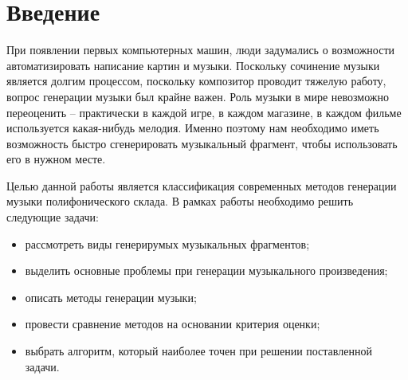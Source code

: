 \chapter*{Введение}

При появлении первых компьютерных машин, люди задумались о возможности автоматизировать написание картин и музыки. Поскольку сочинение музыки является долгим процессом, поскольку композитор проводит тяжелую работу, вопрос генерации музыки был крайне важен. Роль музыки в мире невозможно переоценить -- практически в каждой игре, в каждом магазине, в каждом фильме используется какая-нибудь мелодия. Именно поэтому нам необходимо иметь возможность быстро сгенерировать музыкальный фрагмент, чтобы использовать его в нужном месте.

Целью данной работы является классификация современных методов генерации музыки полифонического склада. В рамках работы необходимо решить следующие задачи:

\begin{itemize}
    \item рассмотреть виды генерирумых музыкальных фрагментов;
    \item выделить основные проблемы при генерации музыкального произведения;
    \item описать методы генерации музыки;
    \item провести сравнение методов на основании критерия оценки;
    \item выбрать алгоритм, который наиболее точен при решении поставленной задачи.
\end{itemize}













